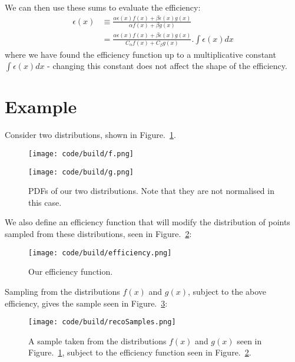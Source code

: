 \documentclass{article}
\begin{document}
We can then use these sums to evaluate the efficiency:
\begin{equation}
    \begin{aligned}
        \epsilon(x) & \equiv \frac{\alpha\epsilon(x)f(x) + \beta\epsilon(x)g(x)}{\alpha f(x) + \beta g(x)}                    \\
                    & = \frac{\alpha\epsilon(x)f(x) + \beta\epsilon(x)g(x)}{C_\alpha f(x) + C_\beta g(x)} . \int\epsilon(x)dx
    \end{aligned}
    \label{efficiency_expression}
\end{equation}
where we have found the efficiency function up to a multiplicative constant $\int\epsilon(x)dx$ - changing this constant
does not affect the shape of the efficiency.

\section{Example}
Consider two distributions, shown in Figure.~\ref{f, g dists}.
\begin{figure}[h!]
    \begin{minipage}{0.49\textwidth}
        \texttt{[image: code/build/f.png]}
        \centering
    \end{minipage}
    \begin{minipage}{0.49\textwidth}
        \texttt{[image: code/build/g.png]}
        \centering
    \end{minipage}
    \caption{PDFs of our two distributions. Note that they are not normalised in this case.}
    \label{f, g dists}
\end{figure}

We also define an efficiency function that will modify the distribution of points sampled from these distributions, seen in
Figure.~\ref{efficiency_plot}:
\begin{figure}[h!]
    \texttt{[image: code/build/efficiency.png]}
    \centering
    \caption{Our efficiency function.}
    \label{efficiency_plot}
\end{figure}

Sampling from the distributions $f(x)$ and $g(x)$, subject to the above efficiency, gives the sample seen in
Figure.~\ref{samples}:
\begin{figure}[h!]
    \texttt{[image: code/build/recoSamples.png]}
    \centering
    \caption{A sample taken from the distributions $f(x)$ and $g(x)$ seen in Figure.~\ref{f, g dists},
        subject to the efficiency function seen in Figure.~\ref{efficiency_plot}.}
    \label{samples}
\end{figure}
\end{document}
